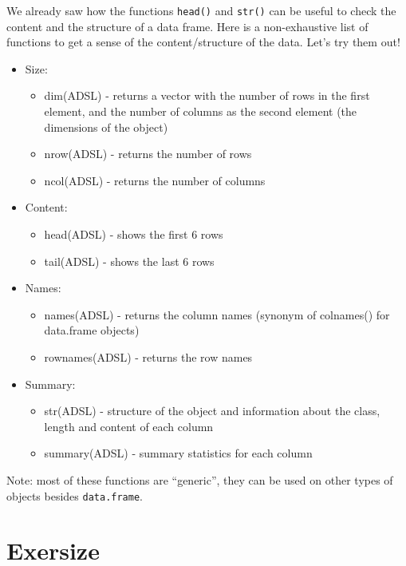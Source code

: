 \documentclass[]{book}
\providecommand{\tightlist}{%
  \setlength{\itemsep}{0pt}\setlength{\parskip}{0pt}}
\begin{document}
We already saw how the functions \texttt{head()} and \texttt{str()} can be useful to check the content and the structure of a data frame. Here is a non-exhaustive list of functions to get a sense of the content/structure of the data. Let's try them out!

\begin{itemize}
\tightlist
\item
  Size:

  \begin{itemize}
  \tightlist
  \item
    dim(ADSL) - returns a vector with the number of rows in the first element, and the number of columns as the second element (the dimensions of the object)
  \item
    nrow(ADSL) - returns the number of rows
  \item
    ncol(ADSL) - returns the number of columns
  \end{itemize}
\item
  Content:

  \begin{itemize}
  \tightlist
  \item
    head(ADSL) - shows the first 6 rows
  \item
    tail(ADSL) - shows the last 6 rows
  \end{itemize}
\item
  Names:

  \begin{itemize}
  \tightlist
  \item
    names(ADSL) - returns the column names (synonym of colnames() for data.frame objects)
  \item
    rownames(ADSL) - returns the row names
  \end{itemize}
\item
  Summary:

  \begin{itemize}
  \tightlist
  \item
    str(ADSL) - structure of the object and information about the class, length and content of each column
  \item
    summary(ADSL) - summary statistics for each column
  \end{itemize}
\end{itemize}

Note: most of these functions are ``generic'', they can be used on other types of objects besides \texttt{data.frame}.

\hypertarget{exersize}{%
\section{Exersize}\label{exersize}}
\end{document}
